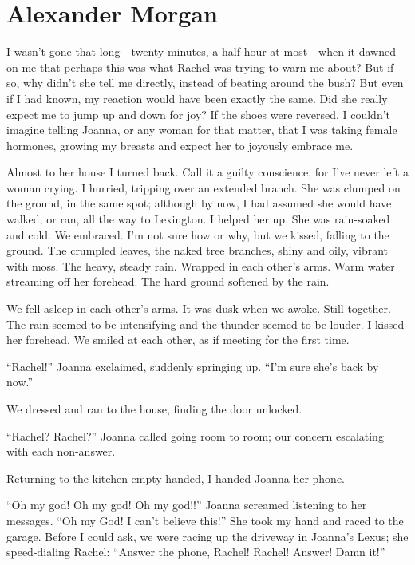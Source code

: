 \chapter{Alexander Morgan}

\titlemark

I wasn't gone that long---twenty minutes, a half hour at most---when it
dawned on me that perhaps this was what Rachel was trying to warn me
about? But if so, why didn't she tell me directly, instead of beating
around the bush? But even if I had known, my reaction would have been
exactly the same. Did she really expect me to jump up and down for joy?
If the shoes were reversed, I couldn't imagine telling Joanna, or any
woman for that matter, that I was taking female hormones, growing my
breasts and expect her to joyously embrace me.

Almost to her house I turned back. Call it a guilty conscience, for I've
never left a woman crying. I hurried, tripping over an extended branch.
She was clumped on the ground, in the same spot; although by now, I had
assumed she would have walked, or ran, all the way to Lexington. I
helped her up. She was rain-soaked and cold. We embraced. I'm not sure
how or why, but we kissed, falling to the ground. The crumpled leaves,
the naked tree branches, shiny and oily, vibrant with moss. The heavy,
steady rain. Wrapped in each other's arms. Warm water streaming off her
forehead. The hard ground softened by the rain.

We fell asleep in each other's arms. It was dusk when we awoke. Still
together. The rain seemed to be intensifying and the thunder seemed to
be louder. I kissed her forehead. We smiled at each other, as if meeting
for the first time.

``Rachel!'' Joanna exclaimed, suddenly springing up. ``I'm sure she's
back by now.''

We dressed and ran to the house, finding the door unlocked.

``Rachel? Rachel?'' Joanna called going room to room; our concern
escalating with each non-answer.

Returning to the kitchen empty-handed, I handed Joanna her phone.

``Oh my god! Oh my god! Oh my god!!'' Joanna screamed listening to her
messages. ``Oh my God! I can't believe this!'' She took my hand and
raced to the garage. Before I could ask, we were racing up the driveway
in Joanna's Lexus; she speed-dialing Rachel: ``Answer the phone, Rachel!
Rachel! Answer! Damn it!''

